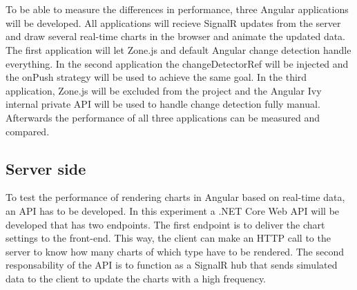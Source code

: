 
\chapter{}
\label{ch:methodologie}

To be able to measure the differences in performance, three Angular applications will be developed. All applications will recieve SignalR updates from the server and draw several real-time charts in the browser and animate the updated data. The first application will let Zone.js and default Angular change detection handle everything. In the second application the changeDetectorRef will be injected and the onPush strategy will be used to achieve the same goal. In the third application, Zone.js will be excluded from the project and the Angular Ivy internal private API will be used to handle change detection fully manual. Afterwards the performance of all three applications can be measured and compared.

\section{Server side}
To test the performance of rendering charts in Angular based on real-time data, an API has to be developed. In this experiment a .NET Core Web API will be developed that has two endpoints. The first endpoint is to deliver the chart settings to the front-end. This way, the client can make an HTTP call to the server to know how many charts of which type have to be rendered. The second responsability of the API is to function as a SignalR hub that sends simulated data to the client to update the charts with a high frequency.

